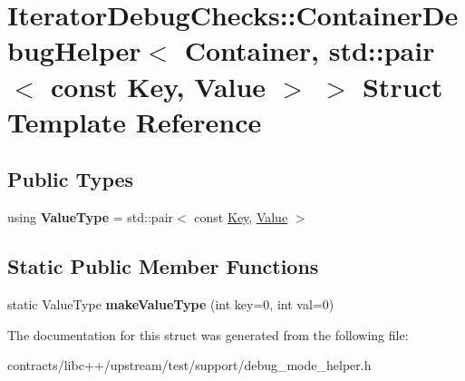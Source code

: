 \hypertarget{struct_iterator_debug_checks_1_1_container_debug_helper_3_01_container_00_01std_1_1pair_3_01const_01_key_00_01_value_01_4_01_4}{}\section{Iterator\+Debug\+Checks\+:\+:Container\+Debug\+Helper$<$ Container, std\+:\+:pair$<$ const Key, Value $>$ $>$ Struct Template Reference}
\label{struct_iterator_debug_checks_1_1_container_debug_helper_3_01_container_00_01std_1_1pair_3_01const_01_key_00_01_value_01_4_01_4}
\subsection*{Public Types}
\begin{DoxyCompactItemize}
\item 
\mbox{\label{struct_iterator_debug_checks_1_1_container_debug_helper_3_01_container_00_01std_1_1pair_3_01const_01_key_00_01_value_01_4_01_4_a6b42b28036e9cfe3a49420a6d6763e4a}} 
using {\bfseries Value\+Type} = std\+::pair$<$ const \mbox{\hyperlink{struct_key}{Key}}, \mbox{\hyperlink{struct_value}{Value}} $>$
\end{DoxyCompactItemize}
\subsection*{Static Public Member Functions}
\begin{DoxyCompactItemize}
\item 
\mbox{\label{struct_iterator_debug_checks_1_1_container_debug_helper_3_01_container_00_01std_1_1pair_3_01const_01_key_00_01_value_01_4_01_4_a4173675ee66162910fe19cbcbd3f1eff}} 
static Value\+Type {\bfseries make\+Value\+Type} (int key=0, int val=0)
\end{DoxyCompactItemize}


The documentation for this struct was generated from the following file\+:\begin{DoxyCompactItemize}
\item 
contracts/libc++/upstream/test/support/debug\+\_\+mode\+\_\+helper.\+h\end{DoxyCompactItemize}
